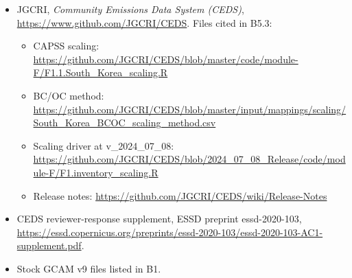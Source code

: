 \begin{itemize}
\tightlist
\item
  JGCRI,
  \emph{Community
  Emissions
  Data
  System
  (CEDS)},
  \url{https://www.github.com/JGCRI/CEDS}. Files cited in B5.3:

  \begin{itemize}
  \tightlist
  \item
    CAPSS scaling:
    \url{https://github.com/JGCRI/CEDS/blob/master/code/module-F/F1.1.South_Korea_scaling.R}
  \item
    BC/OC method:
    \url{https://github.com/JGCRI/CEDS/blob/master/input/mappings/scaling/South_Korea_BCOC_scaling_method.csv}
  \item
    Scaling driver at v\_2024\_07\_08:
    \url{https://github.com/JGCRI/CEDS/blob/2024_07_08_Release/code/module-F/F1.inventory_scaling.R}
  \item
    Release notes: \url{https://github.com/JGCRI/CEDS/wiki/Release-Notes}
  \end{itemize}
\item
  CEDS
  reviewer-response
  supplement,
  ESSD
  preprint
  essd-2020-103,
  \url{https://essd.copernicus.org/preprints/essd-2020-103/essd-2020-103-AC1-supplement.pdf}.
\item
  Stock
  GCAM v9
  files
  listed
  in B1.
\end{itemize}
